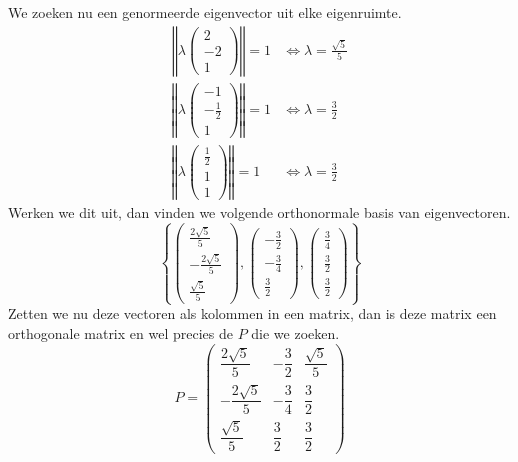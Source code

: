 \documentclass[lineaire_algebra_oplossingen.tex]{subfiles}
\begin{document}
We zoeken nu een genormeerde eigenvector uit elke eigenruimte.
\begin{align*}
\left\Vert
\lambda
\begin{pmatrix}
2 \\ -2\\ 1
\end{pmatrix}
\right\Vert
=1
&\Leftrightarrow
\lambda = \frac{\sqrt{5}}{5} \\
\left\Vert
\lambda
\begin{pmatrix}
-1 \\ -\frac{1}{2} \\ 1
\end{pmatrix}
\right\Vert
=1
&\Leftrightarrow
\lambda = \frac{3}{2} \\
\left\Vert
\lambda
\begin{pmatrix}
\frac{1}{2} \\ 1 \\ 1
\end{pmatrix}
\right\Vert
=1
&\Leftrightarrow
\lambda = \frac{3}{2}
\end{align*}
Werken we dit uit, dan vinden we volgende orthonormale basis van eigenvectoren.
\[
\left\{
\begin{pmatrix}
\frac{2\sqrt{5}}{5} \\ -\frac{2\sqrt{5}}{5}\\ \frac{\sqrt{5}}{5}
\end{pmatrix}
,
\begin{pmatrix}
-\frac{3}{2} \\ -\frac{3}{4} \\ \frac{3}{2}
\end{pmatrix}
,
\begin{pmatrix}
\frac{3}{4} \\ \frac{3}{2} \\ \frac{3}{2}
\end{pmatrix}
\right\}
\]
Zetten we nu deze vectoren als kolommen in een matrix, dan is deze matrix een orthogonale matrix en wel precies de $P$ die we zoeken.
\[
P=
\begin{pmatrix}
\dfrac{2\sqrt{5}}{5}  & -\dfrac{3}{2} & \dfrac{\sqrt{5}}{5}\\[6pt]
-\dfrac{2\sqrt{5}}{5} & -\dfrac{3}{4} & \dfrac{3}{2}\\[6pt]
\dfrac{\sqrt{5}}{5} & \dfrac{3}{2}    & \dfrac{3}{2}
\end{pmatrix}
\]
\end{document}
